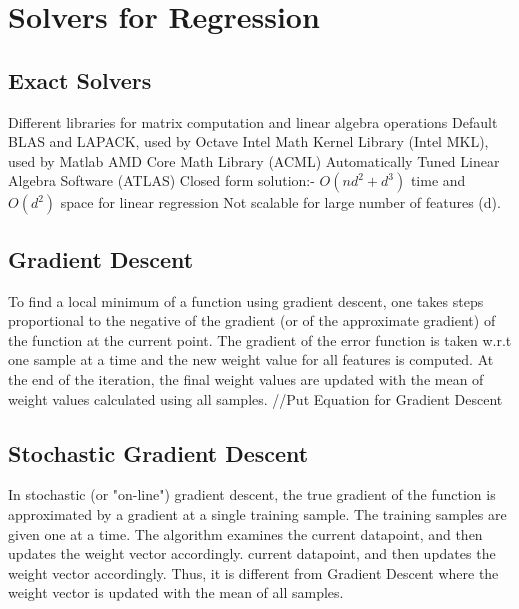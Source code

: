 \documentclass{sigplanconf}
\begin{document}
\section{Solvers for Regression}
\subsection{Exact Solvers}
Different libraries for matrix computation and linear algebra operations
Default BLAS and LAPACK, used by Octave
Intel Math Kernel Library (Intel MKL), used by Matlab
AMD Core Math Library (ACML)
Automatically Tuned Linear Algebra Software (ATLAS)
Closed form solution:- \begin {math} O(nd^2 + d^3) \end {math} time and \begin {math} O(d^2) \end {math} space for linear regression
Not scalable for large number of features (d).

\subsection{Gradient Descent}
To find a local minimum of a function using gradient descent, one takes steps proportional to the negative of 
the gradient (or of the approximate gradient) of the function at the current point. The gradient of the error 
function is taken w.r.t one sample at a time and the new weight value for all features is computed.
At the end of the iteration, the final weight values are updated with the mean of weight values calculated using all samples.
//Put Equation for Gradient Descent

\subsection{Stochastic Gradient Descent}
In stochastic (or "on-line") gradient descent, the true gradient of the function is approximated by a gradient at a
single training sample. The training samples are given one at a time. The algorithm examines the
current datapoint, and then updates the weight vector accordingly.
current datapoint, and then updates the weight vector accordingly. Thus, it is different from Gradient Descent where the weight
vector is updated with the mean of all samples.
\end{document}
